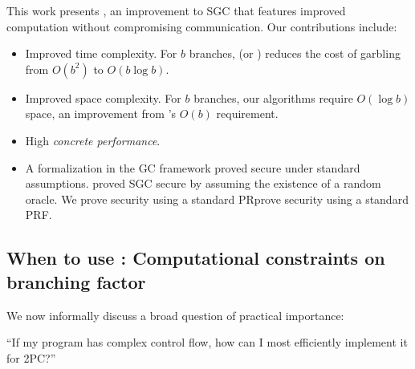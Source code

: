 \medskip
This work presents \ourschemelong, an improvement to SGC that features
improved computation without compromising communication.
Our contributions include:
\begin{itemize}
  \item Improved time complexity.
    For $b$ branches, \ourschemelong (or
    \ourscheme)  reduces the cost of garbling  from $O(b^2)$ to
    $O(b \log b)$.
  \item Improved space complexity.
    For $b$ branches, our algorithms require $O(\log b)$ space, an
    improvement from \HK's $O(b)$ requirement.
  \item High \emph{concrete performance}.
  \item
    A formalization in the \cite{CCS:BelHoaRog12} GC framework proved
    secure under standard assumptions.
    \HK proved SGC secure by assuming the existence of a random oracle.
    We prove security using a standard PRprove security using a
    standard PRF.
\end{itemize}



\subsection{When to use \ourscheme: Computational constraints on branching factor}
\label{sec:whentouse}

We now informally discuss a broad question of
practical importance:

\begin{displayquote}
  ``If my program has complex control flow, how can I most efficiently implement it for 2PC?''
\end{displayquote}

